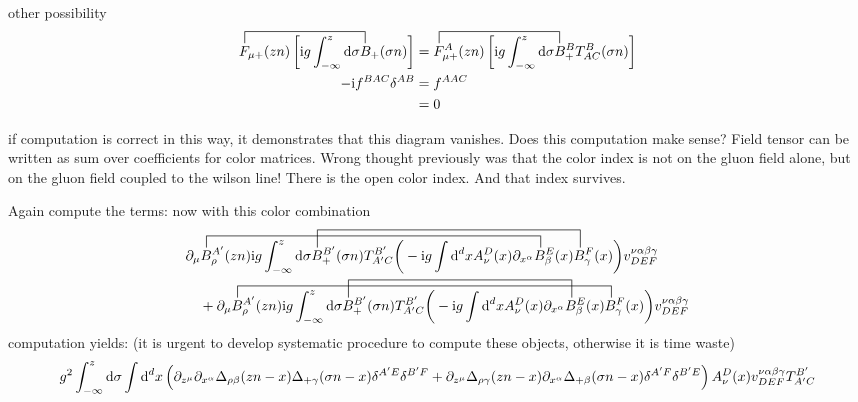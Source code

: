 other possibility
\begin{align}
	\contraction[2ex]{}{\ft}{\ft_{\mu +}(zn)\big[ \imag g  \int _{-\infty} ^{z} \dx}{B}
	\ft_{\mu +}(zn)\left[ \imag g  \int _{-\infty} ^{z} \dx \sigma B_+ (\sigma n) \right]	
	&=
	\contraction[2ex]{}{\ft}{\ft^A_{\mu +}(zn)\big[ \imag g  \int _{-\infty} ^{z} \dx}{B}
	\ft^A_{\mu +}(zn)\left[ \imag g  \int _{-\infty} ^{z} \dx \sigma B_+^BT^B_{AC} (\sigma n) \right]
	\\
	-\imag f^{BAC}\delta^{AB}
	&=
	f^{AAC}
	\\
	&=0
\end{align}

if computation is correct in this way, it demonstrates that this diagram vanishes.
Does this computation make sense?  Field tensor can be written as sum over coefficients for color matrices. Wrong thought previously was that the color index is not on the gluon field alone, but on the gluon field coupled to the wilson line! There is the open color index. And that index survives. 

Again compute the terms: now with this color combination
\begin{align}
	&\contraction[2ex]{\partial_\mu}{B}{^{A'}_\rho(zn) \imag g \int _{-\infty}^{z} \dx \sigma B_+^{B'}(\sigma n) T^{B'}_{A'C}\bigg(-\imag g \int \ddx xA_\nu^D(x) \partial_{x^\alpha}}{B}
	\contraction[3ex]{\partial_\mu B^{A'}_\rho (zn) \imag g \int _{-\infty}^{z} \dx \sigma}{B}{_+^{B'}(\sigma n) T^{B'}_{A'C}\bigg(-\imag g \int \ddx xA_\nu^D(x) \partial_{x^\alpha} B_\beta^{E} (x) }{B}
	\partial_\mu B^{A'}_\rho (zn) \imag g \int _{-\infty}^{z} \dx \sigma B_+^{B'}(\sigma n) T^{B'}_{A'C}\bigg(-\imag g \int \ddx xA_\nu^D(x) \partial_{x^\alpha} B_\beta^{E} (x) B_\gamma^F(x) \bigg) v^{\nu \alpha\beta\gamma}_{DEF}
	\nl
	+\contraction[2ex]{\partial_\mu}{B}{^{A'}_\rho (zn) \imag g \int _{-\infty}^{z} \dx \sigma B_+^{B'}(\sigma n) T^{B'}_{A'C}\bigg(-\imag g \int \ddx xA_\nu^D(x) \partial_{x^\alpha} B_\beta^{E} (x) }{B}
	\contraction[3ex]{\partial_\mu B^{A'}_\rho (zn) \imag g \int _{-\infty}^{z} \dx \sigma}{B}{_+^{B'}(\sigma n) T^{B'}_{A'C}\bigg(-\imag g \int \ddx xA_\nu^D(x) \partial_{x^\alpha} }{B}
	\partial_\mu B^{A'}_\rho (zn) \imag g \int _{-\infty}^{z} \dx \sigma B_+^{B'}(\sigma n) T^{B'}_{A'C}\bigg(-\imag g \int \ddx xA_\nu^D(x) \partial_{x^\alpha} B_\beta^{E} (x) B_\gamma^F(x) \bigg) v^{\nu \alpha\beta\gamma}_{DEF}
\end{align}
computation yields: (it is urgent to develop systematic procedure to compute these objects, otherwise it is time waste)
\begin{align}
	g^2\int_{-\infty}^z \text{d} \sigma  \int \text{d} ^d x 
	\left( \partial_{z^\mu} \partial_{x^\alpha} \Delta_{\rho \beta}(zn-x) \Delta_{+ \gamma}(\sigma n -x)\delta^{A'E} \delta^{B'F} + \partial_{z^\mu}  \Delta_{\rho \gamma}(zn-x) \partial_{x^\alpha}\Delta_{+ \beta}(\sigma n -x) \delta^{A'F} \delta^{B'E} \right)A_{\nu}^{D}(x)v^{\nu \alpha\beta\gamma}_{DEF} T^{B'}_{A'C}
\end{align}

